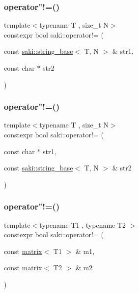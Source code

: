 \subsubsection{\texorpdfstring{operator"!=()}{operator!=()}\hspace{0.1cm}{\footnotesize\ttfamily [11/14]}}
{\footnotesize\ttfamily template$<$typename T , size\+\_\+t N$>$ \\
constexpr bool saki\+::operator!= (\begin{DoxyParamCaption}\item[{const \mbox{\hyperlink{classsaki_1_1string__base}{saki\+::string\+\_\+base}}$<$ T, N $>$ \&}]{str1,  }\item[{const char $\ast$}]{str2 }\end{DoxyParamCaption})}

\mbox{\label{namespacesaki_a155d8277bf6806453219cc8145920fbd}} 
\subsubsection{\texorpdfstring{operator"!=()}{operator!=()}\hspace{0.1cm}{\footnotesize\ttfamily [12/14]}}
{\footnotesize\ttfamily template$<$typename T , size\+\_\+t N$>$ \\
constexpr bool saki\+::operator!= (\begin{DoxyParamCaption}\item[{const char $\ast$}]{str1,  }\item[{const \mbox{\hyperlink{classsaki_1_1string__base}{saki\+::string\+\_\+base}}$<$ T, N $>$ \&}]{str2 }\end{DoxyParamCaption})}

\mbox{\label{namespacesaki_a4bef07cf55a40a115c89e6e20406b124}} 
\subsubsection{\texorpdfstring{operator"!=()}{operator!=()}\hspace{0.1cm}{\footnotesize\ttfamily [13/14]}}
{\footnotesize\ttfamily template$<$typename T1 , typename T2 $>$ \\
constexpr bool saki\+::operator!= (\begin{DoxyParamCaption}\item[{const \mbox{\hyperlink{classsaki_1_1matrix}{matrix}}$<$ T1 $>$ \&}]{m1,  }\item[{const \mbox{\hyperlink{classsaki_1_1matrix}{matrix}}$<$ T2 $>$ \&}]{m2 }\end{DoxyParamCaption})}



